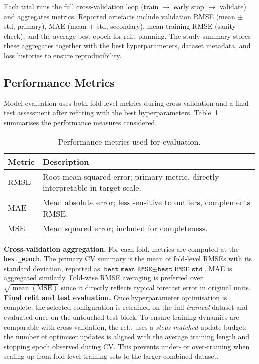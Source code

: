 \documentclass[conference]{IEEEtran}
\begin{document}
Each trial runs the full cross-validation loop (train $\rightarrow$ early stop $\rightarrow$ validate) and aggregates metrics. Reported artefacts include validation RMSE (mean $\pm$ std, primary), MAE (mean $\pm$ std, secondary), mean training RMSE (sanity check), and the average best epoch for refit planning. The study summary stores these aggregates together with the best hyperparameters, dataset metadata, and loss histories to ensure reproducibility. 

\subsection{\textbf{Performance Metrics}}
\vspace{-0.7mm}
\noindent Model evaluation uses both fold-level metrics during cross-validation and a final test assessment after refitting with the best hyperparameters. Table~\ref{tab:metrics} summarises the performance measures considered.

\begin{table}[h]
    \renewcommand{\arraystretch}{1.3} %
    \centering
    \caption{Performance metrics used for evaluation.}
    \label{tab:metrics}
    \begin{tabular}{p{1.5cm}p{5.8cm}}
    \hline
    \textbf{Metric} & \textbf{Description} \\
    \hline
    RMSE & Root mean squared error; primary metric, directly interpretable in target scale. \\
    MAE  & Mean absolute error; less sensitive to outliers, complements RMSE. \\
    MSE  & Mean squared error; included for completeness. \\
    \hline
    \end{tabular}
    \end{table}
    
    
    

\noindent \textbf{Cross-validation aggregation.}
For each fold, metrics are computed at the \texttt{best\_epoch}. The primary CV summary is the mean of fold-level RMSEs with its standard deviation, reported as $\texttt{best\_mean\_RMSE} \pm \texttt{best\_RMSE\_std}$. MAE is aggregated similarly. Fold-wise RMSE averaging is preferred over $\sqrt{\operatorname{mean}(\text{MSE})}$ since it directly reflects typical forecast error in original units.\\

\noindent \textbf{Final refit and test evaluation.}
Once hyperparameter optimisation is complete, the selected configuration is retrained on the full \textit{trainval} dataset and evaluated once on the untouched test block. To ensure training dynamics are comparable with cross-validation, the refit uses a \emph{steps-matched} update budget: the number of optimiser updates is aligned with the average training length and stopping epoch observed during CV. This prevents under- or over-training when scaling up from fold-level training sets to the larger combined dataset.
\end{document}
